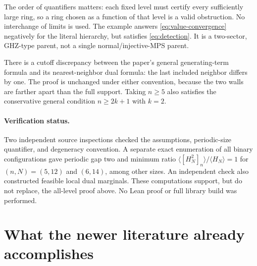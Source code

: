 \documentclass{article}
\begin{document}
The order of quantifiers matters: each fixed level must certify every
sufficiently large ring, so a ring chosen as a function of that level is
a valid obstruction. No interchange of limits is used. The example
answers \eqref{eq:value-convergence} negatively for the literal hierarchy,
but satisfies \eqref{eq:detection}. It is a two-sector, GHZ-type parent,
not a single normal/injective-MPS parent.

There is a cutoff discrepancy between the paper's general generating-term
formula and its nearest-neighbor dual formula: the last included neighbor
differs by one. The proof is unchanged under either convention, because
the two walls are farther apart than the full support. Taking $n\geq5$
also satisfies the conservative general condition $n\geq2k+1$ with $k=2$.

\paragraph{Verification status.}
Two independent source inspections checked the assumptions, periodic-size
quantifier, and degeneracy convention. A separate exact enumeration of all
binary configurations gave periodic gap two and minimum ratio
$\langle[H_N^2]_n\rangle/\langle H_N\rangle=1$ for
$(n,N)=(5,12)$ and $(6,14)$, among other sizes. An independent check also
constructed feasible local dual marginals. These computations support,
but do not replace, the all-level proof above. No Lean proof or full
library build was performed.

\section{What the newer literature already accomplishes}
\label{sec:occupied}
\end{document}
